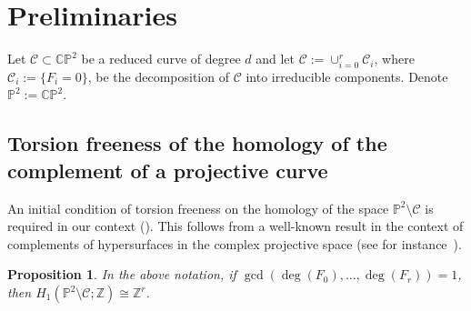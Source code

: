\documentclass[11pt]{amsart}
\def\cC{\mathcal{C}}
\theoremstyle{plain}
\newtheorem{proposition}[thm]{Proposition}
\theoremstyle{definition}
\begin{document}
\section{Preliminaries}

Let $\mathcal{C} \subset \mathbb{C}\mathbb{P}^2$ be a reduced curve of degree $d$ and let $ \mathcal{C}:=\cup_{i=0}^r \mathcal{C}_i$, where $\mathcal{C}_i:=\{ F_i =0\}$, be the decomposition of $\mathcal{C}$ into irreducible components. 
Denote $\mathbb{P}^2:=\mathbb{C} \mathbb{P}^{2} $.

\subsection{Torsion freeness of the homology of the complement of a projective curve}

An initial condition of torsion freeness on the homology of the space $\mathbb P^2\setminus \mathcal{C}$ is required in our context (\cite[Theorem C]{PS3}). This follows from a well-known result in the context of complements of hypersurfaces in the complex projective space (see for instance~\cite[\S4 Prop. 1.3]{Dimca-singularities}).

\begin{proposition}
\label{prop:complementC_tors_free}
 In the above notation, if  ${\gcd}(\deg(F_0),\dots,\deg(F_r)) = 1$, then $H_1(\mathbb{P}^2 \setminus \mathcal{C}; \mathbb{Z})\cong \mathbb{Z}^{r}$.
\end{proposition}

\end{document}
